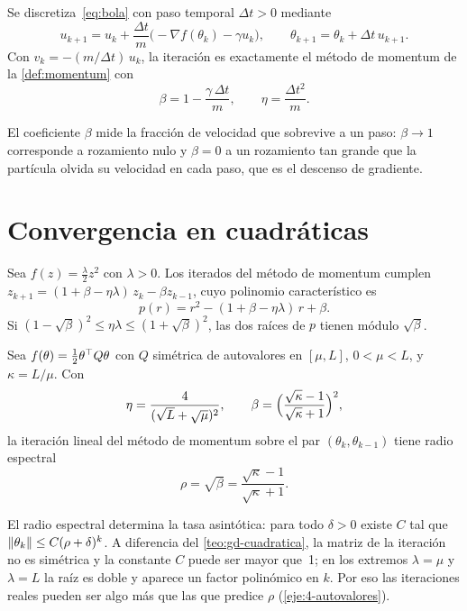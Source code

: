 \begin{proposicion}[Discretización]\label{prop:discretizacion}
Se discretiza~\eqref{eq:bola} con paso temporal $\Delta t>0$ mediante
\[
u_{k+1}=u_k+\frac{\Delta t}{m}\bigl(-\nabla f(\theta_k)-\gamma u_k\bigr),\qquad\theta_{k+1}=\theta_k+\Delta t\,u_{k+1}.
\]
Con $v_k=-(m/\Delta t)\,u_k$, la iteración es exactamente el método de momentum de la \cref{def:momentum} con
\[
\beta=1-\frac{\gamma\,\Delta t}{m},\qquad\eta=\frac{\Delta t^{2}}{m}.
\]
\end{proposicion}

El coeficiente $\beta$ mide la fracción de velocidad que sobrevive a un paso: $\beta\to 1$ corresponde a rozamiento nulo y $\beta=0$ a un rozamiento tan grande que la partícula olvida su velocidad en cada paso, que es el descenso de gradiente.

\section{Convergencia en cuadráticas}

\begin{lema}\label{lem:polinomio}
Sea $f(z)=\frac{\lambda}{2}z^{2}$ con $\lambda>0$. Los iterados del método de momentum cumplen $z_{k+1}=(1+\beta-\eta\lambda)\,z_k-\beta z_{k-1}$, cuyo polinomio característico es
\[
p(r)=r^{2}-(1+\beta-\eta\lambda)\,r+\beta.
\]
Si $(1-\sqrt\beta)^{2}\le\eta\lambda\le(1+\sqrt\beta)^{2}$, las dos raíces de $p$ tienen módulo $\sqrt\beta$.
\end{lema}

\begin{teorema}\label{teo:heavy-ball}
Sea $f(\theta)=\frac12\theta^{\top} Q\theta$ con $Q$ simétrica de autovalores en $[\mu,L]$, $0<\mu<L$, y $\kappa=L/\mu$. Con
\[
\eta=\frac{4}{(\sqrt L+\sqrt\mu)^{2}},\qquad\beta=\Bigl(\frac{\sqrt\kappa-1}{\sqrt\kappa+1}\Bigr)^{2},
\]
la iteración lineal del método de momentum sobre el par $(\theta_k,\theta_{k-1})$ tiene radio espectral
\[
\rho=\sqrt\beta=\frac{\sqrt\kappa-1}{\sqrt\kappa+1}.
\]
\end{teorema}

\begin{observacion}
El radio espectral determina la tasa asintótica: para todo $\delta>0$ existe $C$ tal que $\lVert\theta_k\rVert\le C(\rho+\delta)^{k}$. A diferencia del \cref{teo:gd-cuadratica}, la matriz de la iteración no es simétrica y la constante $C$ puede ser mayor que~1; en los extremos $\lambda=\mu$ y $\lambda=L$ la raíz es doble y aparece un factor polinómico en $k$. Por eso las iteraciones reales pueden ser algo más que las que predice $\rho$ (\cref{eje:4-autovalores}).
\end{observacion}

